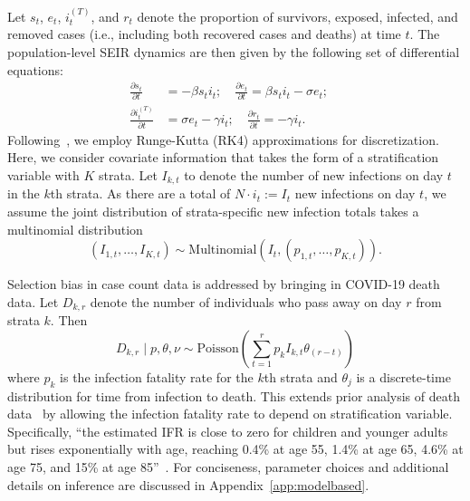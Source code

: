 \documentclass[11pt]{amsart}
\numberwithin{equation}{section}
\theoremstyle{plain}
\begin{document}
Let $s_t$, $e_t$, $i_t^{(T)}$, and $r_t$ denote the proportion of survivors, exposed, infected, and removed cases (i.e., including both recovered cases and deaths) at time $t$.  The population-level SEIR dynamics are then given by the following set of differential equations:
\begin{align*}
\frac{\partial s_t}{\partial t} &= - \beta s_t i_t; \quad \frac{\partial e_t}{\partial t} = \beta s_t i_t - \sigma e_t; \quad \\
\frac{\partial i^{(T)}_t}{\partial t} &= \sigma e_t - \gamma i_t; \quad
\frac{\partial r_t}{\partial t} = - \gamma i_t.
\end{align*}
Following~\cite{Song2020}, we employ Runge-Kutta (RK4) approximations for discretization. Here, we consider covariate information that takes the form of a stratification variable with $K$ strata.  Let $I_{k,t}$ to denote the number of new infections on day $t$ in the $k$th strata.  As there are a total of $N \cdot i_t := I_t$ new infections on day $t$, we assume the joint distribution of strata-specific new infection totals takes a multinomial distribution
$$
( I_{1,t}, \ldots, I_{K,t} ) \sim \text{Multinomial} \left( I_t, (p_{1,t}, \ldots, p_{K, t}) \right).
$$

Selection bias in case count data is addressed by bringing in COVID-19 death data.  Let $D_{k,r}$ denote the number of individuals who pass away on day $r$ from strata $k$.  Then
$$
D_{k,r} \mid p, \theta, \nu \sim \text{Poisson} \left( \sum_{t=1}^r p_{k} I_{k,t} \theta_{(r-t)} \right)
$$
where $p_{k}$ is the infection fatality rate for the $k$th strata and $\theta_{j}$ is a discrete-time distribution for time from infection to death.  This extends prior analysis of death data~\cite{Johndrow2020} by allowing the infection fatality rate to depend on stratification variable.  Specifically, ``the estimated IFR is close to zero for children and younger adults but rises exponentially with age, reaching 0.4\% at age 55, 1.4\% at age 65, 4.6\% at age 75, and 15\% at age 85''~\cite{Levin2020}. For conciseness, parameter choices and additional details on inference are discussed in Appendix~\ref{app:modelbased}.

%
\end{document}
